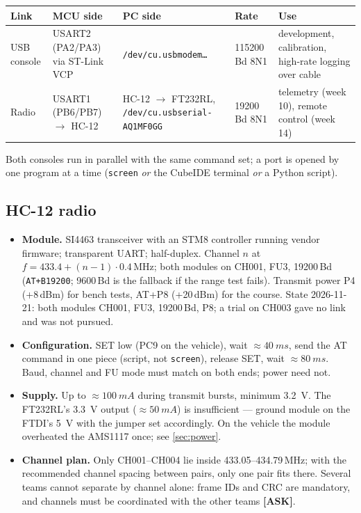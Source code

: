 \documentclass[11pt,a4paper]{article}
\newcommand{\mk}[2]{\textsf{\scriptsize\bfseries\colorbox{#1bg}{\color{#1}[#2]}}}
\newcommand{\ASK}{\mk{good}{ASK}}
\newcommand{\code}[1]{\texttt{\small #1}}
\begin{document}
\begin{center}
\small
\begin{tabularx}{\textwidth}{@{}P{17mm}P{30mm}P{33mm}P{17mm}L@{}}
\toprule
\textbf{Link} & \textbf{MCU side} & \textbf{PC side} & \textbf{Rate} & \textbf{Use}\\
\midrule
USB console & USART2 (PA2/PA3) via ST-Link VCP & \code{/dev/cu.usbmodem\ldots} & 115200\,Bd 8N1 & development, calibration, high-rate logging over cable\\
Radio & USART1 (PB6/PB7) $\to$ HC-12 & HC-12 $\to$ FT232RL, \code{/dev/cu.usbserial-AQ1MF0GG} & 19200\,Bd 8N1 & telemetry (week 10), remote control (week 14)\\
\bottomrule
\end{tabularx}
\end{center}

Both consoles run in parallel with the same command set; a port is opened by one
program at a time (\code{screen} \emph{or} the CubeIDE terminal \emph{or} a Python
script).

\subsection{HC-12 radio}\label{sec:hc12}

\begin{itemize}[leftmargin=6mm]
\item \textbf{Module.} SI4463 transceiver with an STM8 controller running vendor
firmware; transparent UART; half-duplex. Channel $n$ at
$f=433.4+(n-1)\cdot0.4$\,MHz; both modules on CH001, FU3, 19200\,Bd (\code{AT+B19200}; 9600\,Bd is the fallback if the range test fails). Transmit
power P4 (+8\,dBm) for bench tests, AT+P8 (+20\,dBm) for the course. State 2026-11-21: both modules CH001, FU3, 19200\,Bd, P8; a trial on CH003 gave no link and was not pursued.
\item \textbf{Configuration.} SET low (PC9 on the vehicle), wait
$\approx\qty{40}{ms}$, send the AT command in one piece (script, not
\code{screen}), release SET, wait $\approx\qty{80}{ms}$. Baud, channel and FU mode
must match on both ends; power need not.
\item \textbf{Supply.} Up to $\approx\qty{100}{mA}$ during transmit bursts, minimum
\qty{3.2}{V}. The FT232RL's \qty{3.3}{V} output ($\approx\qty{50}{mA}$) is
insufficient --- ground module on the FTDI's \qty{5}{V} with the jumper set
accordingly. On the vehicle the module overheated the AMS1117 once; see
\cref{sec:power}.
\item \textbf{Channel plan.} Only CH001--CH004 lie inside 433.05--434.79\,MHz; with
the recommended channel spacing between pairs, only one pair fits there. Several
teams cannot separate by channel alone: frame IDs and CRC are mandatory, and
channels must be coordinated with the other teams \ASK.
\end{itemize}
\end{document}
